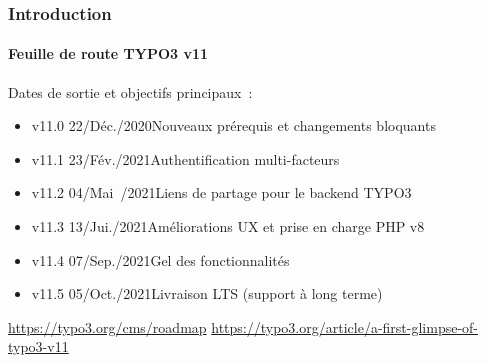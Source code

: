 %

\begin{frame}[fragile]
	\frametitle{Introduction}
	\framesubtitle{Feuille de route TYPO3 v11}

	Dates de sortie et objectifs principaux~:

	\begin{itemize}
		\item v11.0 \tabto{1.1cm}22/Déc./2020\tabto{3.4cm}Nouveaux prérequis et changements bloquants
		\item v11.1 \tabto{1.1cm}23/Fév./2021\tabto{3.4cm}Authentification multi-facteurs
		\item v11.2 \tabto{1.1cm}04/Mai~/2021\tabto{3.4cm}Liens de partage pour le backend TYPO3
		\item v11.3 \tabto{1.1cm}13/Jui./2021\tabto{3.4cm}Améliorations UX et prise en charge PHP v8
		\item
			\begingroup
				\color{typo3orange}
				v11.4 \tabto{1.1cm}07/Sep./2021\tabto{3.4cm}Gel des fonctionnalités
			\endgroup
		\item v11.5 \tabto{1.1cm}05/Oct./2021\tabto{3.4cm}Livraison LTS (support à long terme)
	\end{itemize}

	\smaller
		\url{https://typo3.org/cms/roadmap}\newline
		\url{https://typo3.org/article/a-first-glimpse-of-typo3-v11}
	\normalsize

\end{frame}

